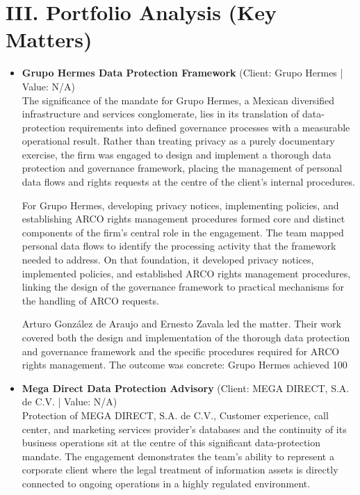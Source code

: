 \documentclass[11pt]{article}
\begin{document}
\section*{III. Portfolio Analysis (Key Matters)}
\begin{itemize}
\item \textbf{Grupo Hermes Data Protection Framework} (Client: Grupo Hermes | Value: N/A)\\ The significance of the mandate for Grupo Hermes, a Mexican diversified infrastructure and services conglomerate, lies in its translation of data-protection requirements into defined governance processes with a measurable operational result. Rather than treating privacy as a purely documentary exercise, the firm was engaged to design and implement a thorough data protection and governance framework, placing the management of personal data flows and rights requests at the centre of the client’s internal procedures.

For Grupo Hermes, developing privacy notices, implementing policies, and establishing ARCO rights management procedures formed core and distinct components of the firm’s central role in the engagement. The team mapped personal data flows to identify the processing activity that the framework needed to address. On that foundation, it developed privacy notices, implemented policies, and established ARCO rights management procedures, linking the design of the governance framework to practical mechanisms for the handling of ARCO requests.

Arturo González de Araujo and Ernesto Zavala led the matter. Their work covered both the design and implementation of the thorough data protection and governance framework and the specific procedures required for ARCO rights management. The outcome was concrete: Grupo Hermes achieved 100%
\item \textbf{Mega Direct Data Protection Advisory} (Client: MEGA DIRECT, S.A. de C.V. | Value: N/A)\\ Protection of MEGA DIRECT, S.A. de C.V., Customer experience, call center, and marketing services provider's databases and the continuity of its business operations sit at the centre of this significant data-protection mandate. The engagement demonstrates the team’s ability to represent a corporate client where the legal treatment of information assets is directly connected to ongoing operations in a highly regulated environment.


\end{itemize}
\end{document}
